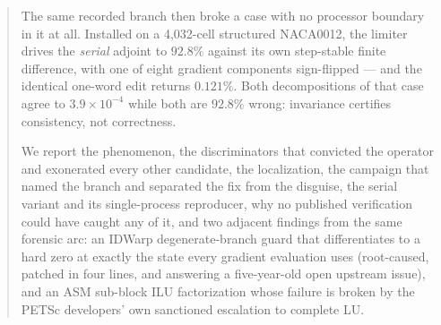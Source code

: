 \documentclass[11pt,a4paper]{article}
\begin{document}
\begin{abstract}
The same recorded branch then broke a case with no processor boundary in it at all.
Installed on a 4{,}032-cell structured NACA0012, the limiter drives the \emph{serial}
adjoint to \(92.8\%\) against its own step-stable finite difference, with one of eight
gradient components sign-flipped --- and the identical one-word edit returns \(0.121\%\).
Both decompositions of that case agree to \(3.9\times10^{-4}\) while both are \(92.8\%\)
wrong: invariance certifies consistency, not correctness.

We report the phenomenon, the discriminators that convicted the operator and exonerated
every other candidate, the localization, the campaign that named the branch and separated
the fix from the disguise, the serial variant and its single-process reproducer, why no
published verification could have caught any of it, and two adjacent findings from the same
forensic arc: an IDWarp degenerate-branch guard that differentiates to a hard zero at
exactly the state every gradient evaluation uses (root-caused, patched in four lines, and
answering a five-year-old open upstream issue), and an ASM sub-block ILU factorization whose
failure is broken by the PETSc developers' own sanctioned escalation to complete LU.


\end{abstract}
\end{document}
